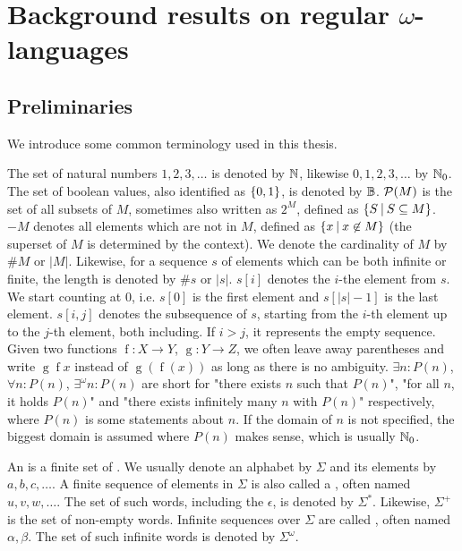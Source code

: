 \section{Background results on regular $\omega$-languages}
\label{chapter:regOmegaLangs}

\subsection{Preliminaries}
We introduce some common terminology used in this thesis.

The set of natural numbers $1,2,3,\dots$ is denoted by $\mathbb{N}$, likewise $0,1,2,3,\dots$ by $\mathbb{N}_0$. The set of boolean values, also identified as $\Set{0,1}$, is denoted by $\mathbb{B}$. $\mathcal{P}(M)$ is the set of all subsets of $M$, sometimes also written as $2^M$, defined as $\Set{S}{S \subseteq M}$. $-M$ denotes all elements which are not in $M$, defined as $\Set{x}{x \not\in M}$ (the superset of $M$ is determined by the context). We denote the cardinality of $M$ by $\#M$ or $\left| M \right|$. Likewise, for a sequence $s$ of elements which can be both infinite or finite, the length is denoted by $\#s$ or $\left|s\right|$. $s[i]$ denotes the $i$-the element from $s$. We start counting at $0$, i.e. $s[0]$ is the first element and $s[\left|s\right|-1]$ is the last element. $s[i,j]$ denotes the subsequence of $s$, starting from the $i$-th element up to the $j$-th element, both including. If $i>j$, it represents the empty sequence. Given two functions $\operatorname{f} \colon X \rightarrow Y$, $\operatorname{g} \colon Y \rightarrow Z$, we often leave away parentheses and write $\operatorname{g} \operatorname{f} x$ instead of $\operatorname{g}(\operatorname{f}(x))$ as long as there is no ambiguity. $\exists n \colon P(n)$, $\forall n \colon P(n)$, $\exists^\omega n \colon P(n)$ are short for "there exists $n$ such that $P(n)$", "for all $n$, it holds $P(n)$" and "there exists infinitely many $n$ with $P(n)$" respectively, where $P(n)$ is some statements about $n$. If the domain of $n$ is not specified, the biggest domain is assumed where $P(n)$ makes sense, which is usually $\mathbb{N}_0$.

An  is a finite set of . We usually denote an alphabet by $\Sigma$ and its elements by $a, b, c, \dots$. A finite sequence of elements in $\Sigma$ is also called a , often named $u, v, w, \dots$. The set of such words, including the  $\epsilon$, is denoted by $\Sigma^*$. Likewise, $\Sigma^+$ is the set of non-empty words. Infinite sequences over $\Sigma$ are called , often named $\alpha, \beta$. The set of such infinite words is denoted by $\Sigma^\omega$.

